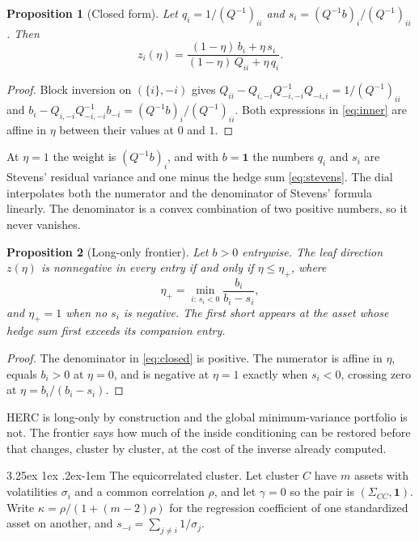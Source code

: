\documentclass[11pt]{article}
\makeatletter
\renewcommand\paragraph{\@startsection{paragraph}{4}{\z@}%
  {3.25ex \@plus1ex \@minus.2ex}{-1em}%
  {\normalfont\normalsize\itshape}}
\newcommand{\ones}{\mathbf{1}}
\newtheorem{proposition}{Proposition}
\makeatother
\begin{document}
\begin{proposition}[Closed form]
\label{prop:closed}
Let $q_i=1/(Q^{-1})_{ii}$ and $s_i=(Q^{-1}b)_i/(Q^{-1})_{ii}$. Then
\begin{equation}
  z_i(\eta)=\frac{(1-\eta)\,b_i+\eta\,s_i}{(1-\eta)\,Q_{ii}+\eta\,q_i} .
  \label{eq:closed}
\end{equation}
\end{proposition}

\begin{proof}
Block inversion on $(\{i\},-i)$ gives
$Q_{ii}-Q_{i,-i}Q_{-i,-i}^{-1}Q_{-i,i}=1/(Q^{-1})_{ii}$ and
$b_i-Q_{i,-i}Q_{-i,-i}^{-1}b_{-i}=(Q^{-1}b)_i/(Q^{-1})_{ii}$. Both
expressions in \eqref{eq:inner} are affine in $\eta$ between their values
at $0$ and $1$.
\end{proof}

At $\eta=1$ the weight is $(Q^{-1}b)_i$, and with $b=\ones$ the numbers
$q_i$ and $s_i$ are Stevens' residual variance and one minus the hedge sum
\eqref{eq:stevens}. The dial interpolates both the numerator and the
denominator of Stevens' formula linearly. The denominator is a convex
combination of two positive numbers, so it never vanishes.

\begin{proposition}[Long-only frontier]
\label{prop:frontier}
Let $b>0$ entrywise. The leaf direction $z(\eta)$ is nonnegative in every
entry if and only if $\eta\le\eta_+$, where
\begin{equation}
  \eta_+=\min_{i:\,s_i<0}\frac{b_i}{b_i-s_i},
  \label{eq:frontier}
\end{equation}
and $\eta_+=1$ when no $s_i$ is negative. The first short appears at the
asset whose hedge sum first exceeds its companion entry.
\end{proposition}

\begin{proof}
The denominator in \eqref{eq:closed} is positive. The numerator is affine
in $\eta$, equals $b_i>0$ at $\eta=0$, and is negative at $\eta=1$ exactly
when $s_i<0$, crossing zero at $\eta=b_i/(b_i-s_i)$.
\end{proof}

HERC is long-only by construction and the global minimum-variance portfolio
is not. The frontier says how much of the inside conditioning can be
restored before that changes, cluster by cluster, at the cost of the
inverse already computed.

\paragraph{The equicorrelated cluster.} Let cluster $C$ have $m$ assets
with volatilities $\sigma_i$ and a common correlation $\rho$, and let
$\gamma=0$ so the pair is $(\Sigma_{CC},\ones)$. Write
$\kappa=\rho/(1+(m-2)\rho)$ for the regression coefficient of one
standardized asset on another, and $s_{-i}=\sum_{j\ne i}1/\sigma_j$.
\end{document}
